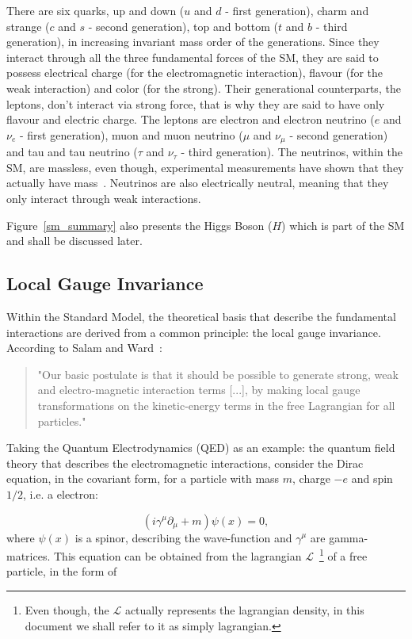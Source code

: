 There are six quarks, up and down ($u$ and $d$ - first generation), charm and strange ($c$ and $s$ - second generation), top and bottom ($t$ and $b$ - third generation), in increasing invariant mass order of the generations. Since they interact through all the three fundamental forces of the SM, they are said to possess electrical charge (for the electromagnetic interaction), flavour (for the weak interaction) and color (for the strong). Their generational counterparts, the leptons, don't interact via strong force, that is why they are said to have only flavour and electric charge. The leptons are electron and electron neutrino ($e$ and $\nu_e$ - first generation), muon and muon neutrino ($\mu$ and $\nu_{\mu}$ - second generation) and tau and tau neutrino ($\tau$ and $\nu_{\tau}$ - third generation). The neutrinos, within the SM, are massless, even though, experimental measurements have shown that they actually have mass~\cite{pdg_2020}. Neutrinos are also electrically neutral, meaning that they only interact through weak interactions.

Figure~\ref{sm_summary} also presents the Higgs Boson ($H$) which is part of the SM and shall be discussed later.

\subsection{Local Gauge Invariance}
\label{lgi_qed}

Within the Standard Model, the theoretical basis that describe the fundamental interactions are derived from a common principle: the local gauge invariance. According to Salam and Ward~\cite{ward_salam}:

\begin{quote}
  "Our basic postulate is that it should be possible to generate strong, weak and electro-magnetic interaction terms [...], by making local gauge transformations on the kinetic-energy terms in the free Lagrangian for all particles."
\end{quote}

Taking the Quantum Electrodynamics (QED) as an example: the quantum field theory that describes the electromagnetic interactions, consider the Dirac equation, in the covariant form, for a particle with mass $m$, charge $-e$ and spin $1/2$, i.e. a electron:

\begin{equation}
    (i \gamma^\mu \partial_\mu + m)\psi(x) = 0,
    \label{dirac_equation}
\end{equation}
where $\psi(x)$ is a spinor, describing the wave-function and $\gamma^\mu$ are gamma-matrices. This equation can be obtained from the lagrangian $\mathcal{L}$~\footnote{Even though, the $\mathcal{L}$ actually represents the lagrangian density, in this document we shall refer to it as simply lagrangian.} of a free particle, in the form of 

